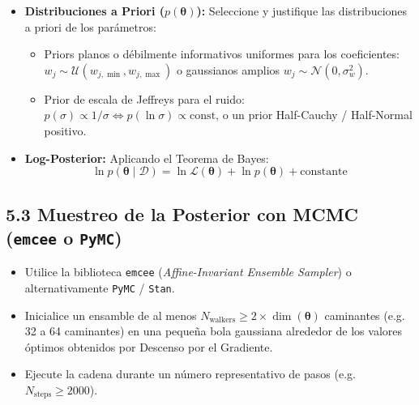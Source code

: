 \documentclass[11pt,a4paper]{article}
\begin{document}
\begin{itemize}[leftmargin=*,itemsep=3pt]
    \item \textbf{Distribuciones a Priori ($p(\bm{\theta})$):} Seleccione y justifique las distribuciones a priori de los parámetros:
    \begin{itemize}[itemsep=1pt]
        \item Priors planos o débilmente informativos uniformes para los coeficientes: $w_j \sim \mathcal{U}(w_{j,\min}, w_{j,\max})$ o gaussianos amplios $w_j \sim \mathcal{N}(0, \sigma_w^2)$.
        \item Prior de escala de Jeffreys para el ruido: $p(\sigma) \propto 1/\sigma \iff p(\ln \sigma) \propto \text{const}$, o un prior Half-Cauchy / Half-Normal positivo.
    \end{itemize}
    \item \textbf{Log-Posterior:} Aplicando el Teorema de Bayes:
    \begin{equation}
        \ln p(\bm{\theta} \mid \mathcal{D}) = \ln \mathcal{L}(\bm{\theta}) + \ln p(\bm{\theta}) + \text{constante}
    \end{equation}
\end{itemize}

\subsection{5.3 Muestreo de la Posterior con MCMC (\texttt{emcee} o \texttt{PyMC})}
\begin{itemize}[leftmargin=*,itemsep=2pt]
    \item Utilice la biblioteca \texttt{emcee} (\textit{Affine-Invariant Ensemble Sampler}) o alternativamente \texttt{PyMC} / \texttt{Stan}.
    \item Inicialice un ensamble de al menos $N_{\text{walkers}} \ge 2 \times \dim(\bm{\theta})$ caminantes (e.g. 32 a 64 caminantes) en una pequeña bola gaussiana alrededor de los valores óptimos obtenidos por Descenso por el Gradiente.
    \item Ejecute la cadena durante un número representativo de pasos (e.g. $N_{\text{steps}} \ge 2000$).
\end{itemize}
\end{document}

